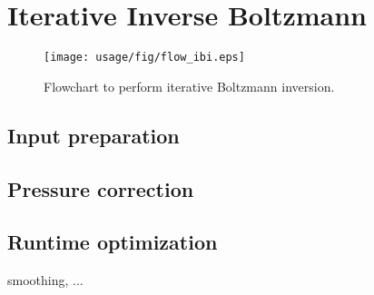 \section{Iterative Inverse Boltzmann}
\begin{figure}
   \centering
   \texttt{[image: usage/fig/flow\_ibi.eps]}
   \caption{Flowchart to perform iterative Boltzmann inversion.}
\end{figure}

\subsection{Input preparation}

\subsection{Pressure correction}

\subsection{Runtime optimization}
smoothing, ...


